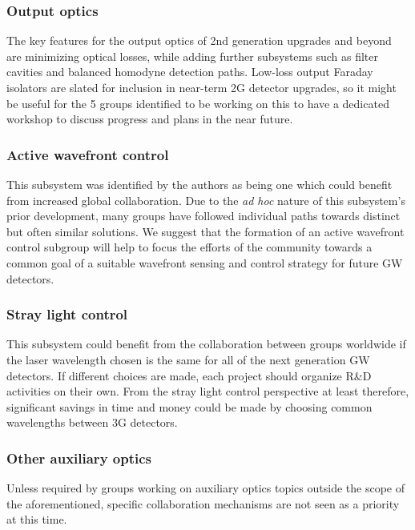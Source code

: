 \subsubsection{\bf Output optics} The key features for the output optics of 2nd generation upgrades and beyond are minimizing optical losses, while adding further subsystems such as filter cavities and balanced homodyne detection paths. 
Low-loss output Faraday isolators are slated for inclusion in near-term 2G detector upgrades, so it might be useful for the 5 groups identified to be working on this to have a dedicated workshop to discuss progress and plans in the near future. 

\subsubsection{\bf Active wavefront control} This subsystem was identified by the authors as being one which could benefit from increased global collaboration. Due to the \emph{ad hoc} nature of this subsystem's prior development, many groups have followed individual paths towards distinct but often similar solutions. We suggest that the formation of an active wavefront control subgroup will help to focus the efforts of the community towards a common goal of a suitable wavefront sensing and control strategy for future GW detectors. 

\subsubsection{\bf Stray light control} This subsystem could benefit from the collaboration between groups worldwide if the laser wavelength chosen is the same for all of the next generation GW detectors. If different choices are made, each project should organize R\&D activities on their own. From the stray light control perspective at least therefore, significant savings in time and money could be made by choosing common wavelengths between 3G detectors. 

\subsubsection{\bf Other auxiliary optics} Unless required by groups working on auxiliary optics topics outside the scope of the aforementioned, specific collaboration mechanisms are not seen as a priority at this time. 

